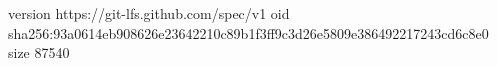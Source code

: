 version https://git-lfs.github.com/spec/v1
oid sha256:93a0614eb908626e23642210c89b1f3ff9c3d26e5809e386492217243cd6c8e0
size 87540
